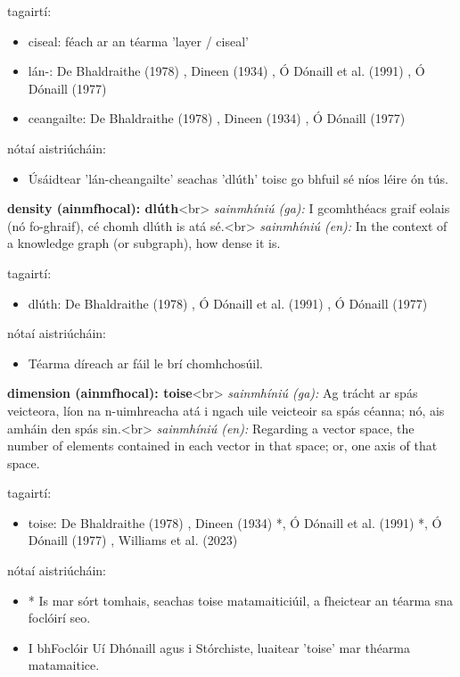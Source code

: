 \documentclass{article}
\begin{document}
tagairtí:
\begin{itemize}
	\item ciseal: féach ar an téarma 'layer / ciseal'
	\item lán-: De Bhaldraithe (1978) \cite{de-bhaldraithe}, Dineen (1934) \cite{dineen}, Ó Dónaill et al. (1991) \cite{focloir-beag}, Ó Dónaill (1977) \cite{odonaill}
	\item ceangailte: De Bhaldraithe (1978) \cite{de-bhaldraithe}, Dineen (1934) \cite{dineen}, Ó Dónaill (1977) \cite{odonaill}
\end{itemize}

nótaí aistriúcháin:
\begin{itemize}
	\item Úsáidtear 'lán-cheangailte' seachas 'dlúth' toisc go bhfuil sé níos léire ón tús.
\end{itemize}


\textbf{density (ainmfhocal): dlúth}<br>
\textit{sainmhíniú (ga):} I gcomhthéacs graif eolais (nó fo-ghraif), cé chomh dlúth is atá sé.<br>
\textit{sainmhíniú (en):} In the context of a knowledge graph (or subgraph), how dense it is.

tagairtí:
\begin{itemize}
	\item dlúth: De Bhaldraithe (1978) \cite{de-bhaldraithe}, Ó Dónaill et al. (1991) \cite{focloir-beag}, Ó Dónaill (1977) \cite{odonaill}
\end{itemize}

nótaí aistriúcháin:
\begin{itemize}
	\item Téarma díreach ar fáil le brí chomhchosúil.
\end{itemize}


\textbf{dimension (ainmfhocal): toise}<br>
\textit{sainmhíniú (ga):} Ag trácht ar spás veicteora, líon na n-uimhreacha atá i ngach uile veicteoir sa spás céanna; nó, ais amháin den spás sin.<br>
\textit{sainmhíniú (en):} Regarding a vector space, the number of elements contained in each vector in that space; or, one axis of that space.

tagairtí:
\begin{itemize}
	\item toise: De Bhaldraithe (1978) \cite{de-bhaldraithe}, Dineen (1934) \cite{dineen}*, Ó Dónaill et al. (1991) \cite{focloir-beag}*, Ó Dónaill (1977) \cite{odonaill}, Williams et al. (2023) \cite{storchiste}
\end{itemize}

nótaí aistriúcháin:
\begin{itemize}
	\item * Is mar sórt tomhais, seachas toise matamaiticiúil, a fheictear an téarma sna foclóirí seo.
	\item I bhFoclóir Uí Dhónaill agus i Stórchiste, luaitear 'toise' mar théarma matamaitice.
\end{itemize}
\end{document}
